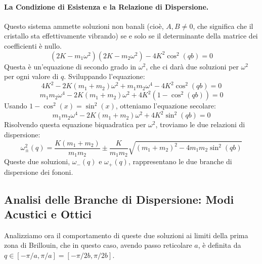 \paragraph{La Condizione di Esistenza e la Relazione di Dispersione.}
Questo sistema ammette soluzioni non banali (cioè, \(A, B \neq 0\), che significa che il cristallo sta effettivamente vibrando) se e solo se il determinante della matrice dei coefficienti è nullo.
\[ (2K - m_1 \omega^2)(2K - m_2 \omega^2) - 4K^2\cos^2(qb) = 0 \]
Questa è un'equazione di secondo grado in \(\omega^2\), che ci darà due soluzioni per \(\omega^2\) per ogni valore di \(q\). Sviluppando l'equazione:
\[ 4K^2 - 2K(m_1+m_2)\omega^2 + m_1m_2\omega^4 - 4K^2\cos^2(qb) = 0 \]
\[ m_1m_2\omega^4 - 2K(m_1+m_2)\omega^2 + 4K^2(1-\cos^2(qb)) = 0 \]
Usando \(1-\cos^2(x) = \sin^2(x)\), otteniamo l'equazione secolare:
\[ m_1m_2\omega^4 - 2K(m_1+m_2)\omega^2 + 4K^2\sin^2(qb) = 0 \]
Risolvendo questa equazione biquadratica per \(\omega^2\), troviamo le due relazioni di dispersione:
\[ \omega^2_{\pm}(q) = \frac{K(m_1+m_2)}{m_1m_2} \pm \frac{K}{m_1m_2}\sqrt{(m_1+m_2)^2 - 4m_1m_2\sin^2(qb)} \]
Queste due soluzioni, \(\omega_-(q)\) e \(\omega_+(q)\), rappresentano le due branche di dispersione dei fononi.

\subsection{Analisi delle Branche di Dispersione: Modi Acustici e Ottici}

Analizziamo ora il comportamento di queste due soluzioni ai limiti della prima zona di Brillouin, che in questo caso, avendo passo reticolare \(a\), è definita da \(q \in [-\pi/a, \pi/a] = [-\pi/2b, \pi/2b]\).

